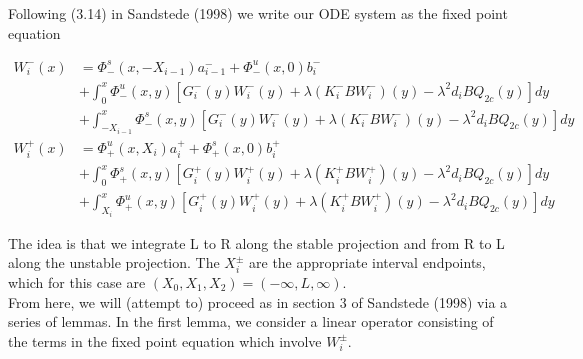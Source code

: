 \documentclass[12pt]{article}
\begin{document}
Following (3.14) in Sandstede (1998) we write our ODE system as the fixed point equation

\begin{align*}
W_i^-(x) &= \Phi^s_-(x, -X_{i-1})a^-_{i-1} + \Phi^u_-(x, 0)b_i^- \\
&+ \int_0^x \Phi^u_-(x, y)[G_i^-(y) W_i^-(y) + \lambda (K_i^- B W_i^-)(y) - \lambda^2 d_i B Q_{2c}(y) ] dy \\
&+ \int_{-X_{i-1}}^x \Phi^s_-(x, y)[G_i^-(y) W_i^-(y) + \lambda (K_i^-B W_i^-)(y) - \lambda^2 d_i B Q_{2c}(y) ] dy \\
W_i^+(x) &= \Phi^u_+(x, X_i)a^+_{i} + \Phi^s_+(x, 0)b_i^+ \\
&+ \int_0^x \Phi^s_+(x, y)[G_i^+(y) W_i^+(y) + \lambda (K_i^+ B W_i^+)(y) - \lambda^2 d_i B Q_{2c}(y) ] dy \\
&+ \int_{X_{i}}^x \Phi^u_+(x, y)[G_i^+(y) W_i^+(y) + \lambda (K_i^+ B W_i^+)(y) - \lambda^2 d_i B Q_{2c}(y) ] dy
\end{align*}

The idea is that we integrate L to R along the stable projection and from R to L along the unstable projection. The $X_i^\pm$ are the appropriate interval endpoints, which for this case are $(X_0, X_1, X_2) = (-\infty, L, \infty)$.\\

From here, we will (attempt to) proceed as in section 3 of Sandstede (1998) via a series of lemmas. In the first lemma, we consider a linear operator consisting of the terms in the fixed point equation which involve $W_i^\pm$. 
\end{document}
